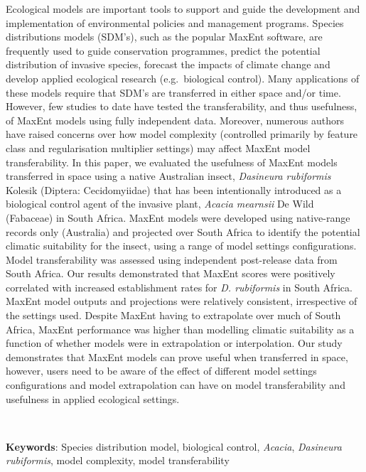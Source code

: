 \documentclass[12pt,]{article}
\begin{document}
Ecological models are important tools to support and guide the
development and implementation of environmental policies and management
programs. Species distributions models (SDM's), such as the popular
MaxEnt software, are frequently used to guide conservation programmes,
predict the potential distribution of invasive species, forecast the
impacts of climate change and develop applied ecological research
(e.g.~biological control). Many applications of these models require
that SDM's are transferred in either space and/or time. However, few
studies to date have tested the transferability, and thus usefulness, of
MaxEnt models using fully independent data. Moreover, numerous authors
have raised concerns over how model complexity (controlled primarily by
feature class and regularisation multiplier settings) may affect MaxEnt
model transferability. In this paper, we evaluated the usefulness of
MaxEnt models transferred in space using a native Australian insect,
\emph{Dasineura rubiformis} Kolesik (Diptera: Cecidomyiidae) that has
been intentionally introduced as a biological control agent of the
invasive plant, \emph{Acacia mearnsii} De Wild (Fabaceae) in South
Africa. MaxEnt models were developed using native-range records only
(Australia) and projected over South Africa to identify the potential
climatic suitability for the insect, using a range of model settings
configurations. Model transferability was assessed using independent
post-release data from South Africa. Our results demonstrated that
MaxEnt scores were positively correlated with increased establishment
rates for \emph{D. rubiformis} in South Africa. MaxEnt model outputs and
projections were relatively consistent, irrespective of the settings
used. Despite MaxEnt having to extrapolate over much of South Africa,
MaxEnt performance was higher than modelling climatic suitability as a
function of whether models were in extrapolation or interpolation. Our
study demonstrates that MaxEnt models can prove useful when transferred
in space, however, users need to be aware of the effect of different
model settings configurations and model extrapolation can have on model
transferability and usefulness in applied ecological settings.

~

\setlength{\parindent}{0in}
\setlength{\leftskip}{0in}
\setlength{\parskip}{8pt}
\vspace*{-0.2in}

\noindent

\textbf{Keywords}: Species distribution model, biological control,
\emph{Acacia}, \emph{Dasineura rubiformis}, model complexity, model
transferability
\end{document}
